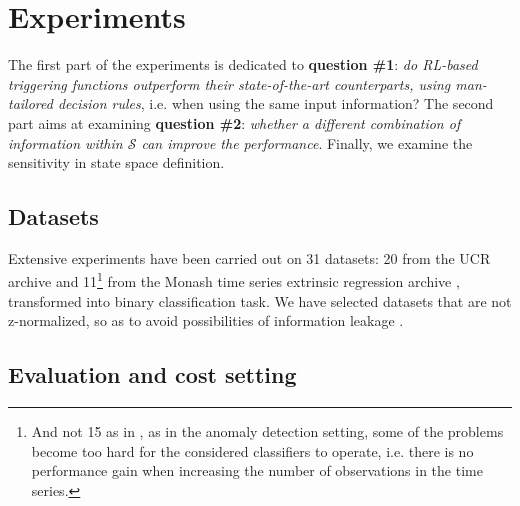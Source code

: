 \documentclass[sigconf, nonacm, table]{acmart}
\begin{document}
 





















    
    
    
    
    
    










\section{Experiments}
\label{sec:expe}


The first part of the experiments is dedicated to \textbf{question \#1}: \textit{do RL-based triggering functions outperform their state-of-the-art counterparts, using man-tailored decision rules}, i.e. when using the same input information? %
The second part aims at examining \textbf{question \#2}: \textit{whether a different combination of information within $\mathcal{S}$ 
can improve the performance}.
Finally, we examine the sensitivity in state space definition.


\subsection{Datasets}
\label{sec:expe_data_and_costs}

Extensive experiments have been carried out on 31 datasets: 20 from the UCR archive \cite{dau2019ucr} and 11\footnote{And not 15 as in \cite{renault2024early}, as in the anomaly detection setting, some of the problems become too hard for the considered classifiers to operate, i.e. there is no performance gain when increasing the number of observations in the time series.} from the Monash time series extrinsic regression archive \cite{tan2021time}, transformed into binary classification task. We have selected datasets that are not z-normalized, so as to avoid possibilities of information leakage \cite{wu2021early}.



\subsection{Evaluation and cost setting}
\end{document}
